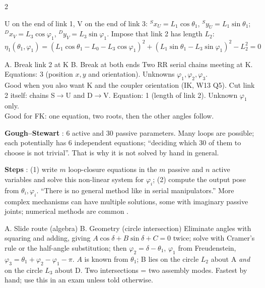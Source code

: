 \begin{multicols}{2}
\begin{fbx}
U on the end of link 1, V on the end of link 3: ${}^Sx_U=L_1\cos\theta_1$, ${}^Sy_U=L_1\sin\theta_1$; ${}^Dx_V=L_3\cos\varphi_1$, ${}^Dy_V=L_3\sin\varphi_1$. Impose that link 2 has length $L_2$:
\[\eta_1(\theta_1,\varphi_1)=(L_1\cos\theta_1-L_0-L_3\cos\varphi_1)^2+(L_1\sin\theta_1-L_3\sin\varphi_1)^2-L_2^2=0\]
\end{fbx}
\begin{twoway}{A. Break link 2 at K }{B. Break at both ends }
Two RR serial chains meeting at K. Equations: 3 (position $x,y$ and orientation). Unknowns $\varphi_1,\varphi_2,\varphi_3$.\\ Good when you also want K and the coupler orientation (IK, W13 Q5).
\tcblower
Cut link 2 itself: chains {S}$\to$U and {D}$\to$V. Equation: 1 (length of link 2). Unknown $\varphi_1$ only.\\ Good for FK: one equation, two roots, then the other angles follow.
\end{twoway}
\textbf{Gough--Stewart} : 6 active and 30 passive parameters. Many loops are possible; each potentially has 6 independent equations; ``deciding which 30 of them to choose is not trivial''. That is why it is not solved by hand in general.

\textbf{Steps} : (1) write $m$ loop-closure equations in the $m$ passive and $n$ active variables and solve this non-linear system for $\varphi_i$; (2) compute the output pose from $\theta_i,\varphi_i$. ``There is no general method like in serial manipulators.'' More complex mechanisms can have multiple solutions, some with imaginary passive joints; numerical methods are common .

\begin{twoway}{A. Slide route (algebra) }{B. Geometry (circle intersection) \added}
Eliminate angles with squaring and adding, giving $A\cos\delta+B\sin\delta+C=0$ twice; solve with Cramer's rule or the half-angle substitution; then $\varphi_2=\delta-\theta_1$, $\varphi_1$ from Freudenstein, $\varphi_3=\theta_1+\varphi_2-\varphi_1-\pi$.
\tcblower
$A$ is known from $\theta_1$; B lies on the circle $L_2$ about A \emph{and} on the circle $L_3$ about D. Two intersections = two assembly modes. Fastest by hand; use this in an exam unless told otherwise.
\end{twoway}


\end{multicols}
